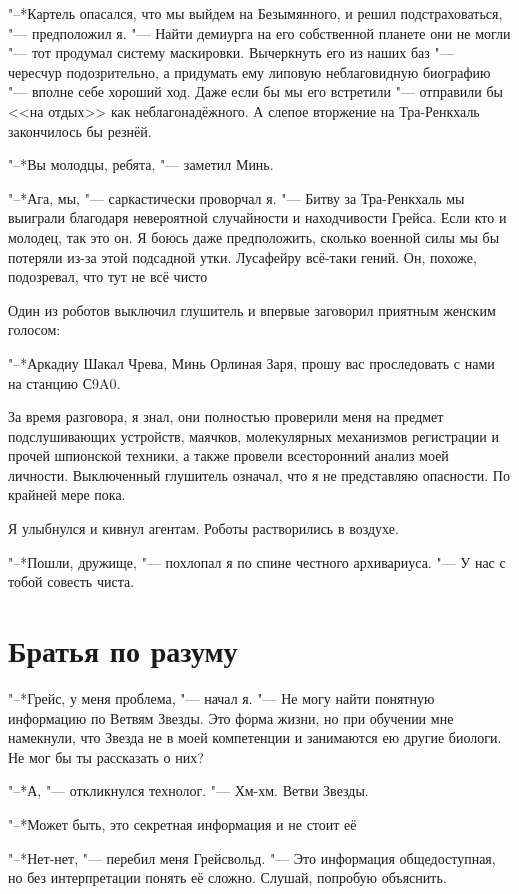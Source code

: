 \documentclass[a4paper,10pt]{book}
\newcommand{\ldotst}{\so{...}\xspace}
\newcommand{\ldotsq}{\so{?\hbox{\hspace{-.212em}}..}\xspace}
\begin{document}
"--*Картель опасался, что мы выйдем на Безымянного, и решил подстраховаться, 
"--- предположил я. "--- Найти демиурга на его собственной планете они не могли 
"--- тот продумал систему маскировки. Вычеркнуть его из наших баз "--- чересчур 
подозрительно, а придумать ему липовую неблаговидную биографию "--- вполне себе 
хороший ход. Даже если бы мы его встретили "--- отправили бы <<на отдых>> как 
неблагонадёжного. А слепое вторжение на Тра-Ренкхаль закончилось бы резнёй.

"--*Вы молодцы, ребята, "--- заметил Минь.

"--*Ага, мы, "--- саркастически проворчал я. "--- Битву за Тра-Ренкхаль мы 
выиграли благодаря невероятной случайности и находчивости Грейса. Если кто и 
молодец, так это он. Я боюсь даже предположить, сколько военной силы мы бы 
потеряли из-за этой подсадной утки. Лусафейру всё-таки гений. Он, похоже, 
подозревал, что тут не всё чисто\ldotst

Один из роботов выключил глушитель и впервые заговорил приятным женским 
голосом: 

"--*Аркадиу Шакал Чрева, Минь Орлиная Заря, прошу вас проследовать с нами на 
станцию С9A0.

За время разговора, я знал, они полностью проверили меня на предмет 
подслушивающих устройств, маячков, молекулярных механизмов регистрации и прочей 
шпионской техники, а также провели всесторонний анализ моей личности. 
Выключенный глушитель означал, что я не представляю опасности. По крайней мере 
пока.

Я улыбнулся и кивнул агентам. Роботы растворились в воздухе.

"--*Пошли, дружище, "--- похлопал я по спине честного архивариуса. "--- У нас с 
тобой совесть чиста.

\section{Братья по разуму}

"--*Грейс, у меня проблема, "--- начал я. "--- Не могу найти понятную 
информацию 
по Ветвям Звезды. Это форма жизни, но при обучении мне намекнули, 
что Звезда не в моей компетенции и занимаются ею другие биологи. Не мог бы ты 
рассказать о них?

"--*А, "--- откликнулся технолог. "--- Хм-хм. Ветви Звезды.

"--*Может быть, это секретная информация и не стоит её\ldotsq

"--*Нет-нет, "--- перебил меня Грейсвольд. "--- Это информация общедоступная, 
но 
без интерпретации понять её сложно. Слушай, попробую объяснить.
\end{document}
